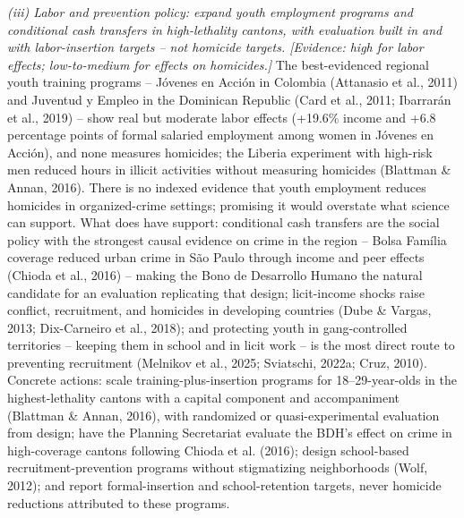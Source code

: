 \textit{(iii) Labor and prevention policy: expand youth employment programs and conditional cash transfers in high-lethality cantons, with evaluation built in and with labor-insertion targets -- not homicide targets. [Evidence: high for labor effects; low-to-medium for effects on homicides.]} The best-evidenced regional youth training programs -- Jóvenes en Acción in Colombia (Attanasio et al., 2011) and Juventud y Empleo in the Dominican Republic (Card et al., 2011; Ibarrarán et al., 2019) -- show real but moderate labor effects (+19.6\% income and +6.8 percentage points of formal salaried employment among women in Jóvenes en Acción), and none measures homicides; the Liberia experiment with high-risk men reduced hours in illicit activities without measuring homicides (Blattman \& Annan, 2016). There is no indexed evidence that youth employment reduces homicides in organized-crime settings; promising it would overstate what science can support. What does have support: conditional cash transfers are the social policy with the strongest causal evidence on crime in the region -- Bolsa Família coverage reduced urban crime in São Paulo through income and peer effects (Chioda et al., 2016) -- making the Bono de Desarrollo Humano the natural candidate for an evaluation replicating that design; licit-income shocks raise conflict, recruitment, and homicides in developing countries (Dube \& Vargas, 2013; Dix-Carneiro et al., 2018); and protecting youth in gang-controlled territories -- keeping them in school and in licit work -- is the most direct route to preventing recruitment (Melnikov et al., 2025; Sviatschi, 2022a; Cruz, 2010). Concrete actions: scale training-plus-insertion programs for 18--29-year-olds in the highest-lethality cantons with a capital component and accompaniment (Blattman \& Annan, 2016), with randomized or quasi-experimental evaluation from design; have the Planning Secretariat evaluate the BDH's effect on crime in high-coverage cantons following Chioda et al. (2016); design school-based recruitment-prevention programs without stigmatizing neighborhoods (Wolf, 2012); and report formal-insertion and school-retention targets, never homicide reductions attributed to these programs.


